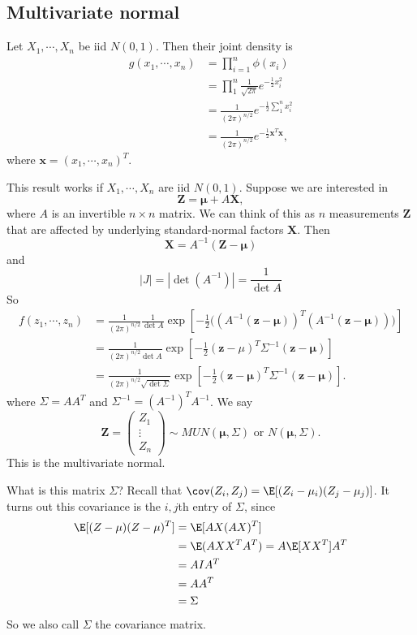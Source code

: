 \documentclass[a4paper]{article}
\begin{document}
\subsection{Multivariate normal}
Let $X_1, \cdots, X_n$ be iid $N(0, 1)$. Then their joint density is
\begin{align*}
  g(x_1, \cdots, x_n) &= \prod_{i = 1}^n \phi(x_i) \\
  &= \prod_{1}^n\frac{1}{\sqrt{2\pi}}e^{-\frac{1}{2}x_i^2}\\
  &= \frac{1}{(2\pi)^{n/2}} e^{-\frac{1}{2}\sum_1^n x_i^2}\\
  &= \frac{1}{(2\pi)^{n/2}}e^{-\frac{1}{2}\mathbf{x}^T \mathbf{x}},
\end{align*}
where $\mathbf{x} = (x_1, \cdots, x_n)^T$.

This result works if $X_1, \cdots, X_n$ are iid $N(0, 1)$. Suppose we are interested in
\[
  \mathbf{Z} = \boldsymbol\mu + A\mathbf{X},
\]
where $A$ is an invertible $n\times n$ matrix. We can think of this as $n$ measurements $\mathbf{Z}$ that are affected by underlying standard-normal factors $\mathbf{X}$. Then
\[
  \mathbf{X} = A^{-1}(\mathbf{Z} - \boldsymbol\mu)
\]
and
\[
  |J| = |\det (A^{-1})| = \frac{1}{\det A}
\]
So
\begin{align*}
  f(z_1, \cdots, z_n) &= \frac{1}{(2\pi)^{n/2}}\frac{1}{\det A}\exp\left[-\frac{1}{2}\big((A^{-1}(\mathbf{z} - \boldsymbol\mu))^T(A^{-1}(\mathbf{z} - \boldsymbol\mu))\big)\right]\\
  &= \frac{1}{(2\pi)^{n/2}\det A}\exp\left[-\frac{1}{2}(\mathbf{z} - \mu)^T \Sigma^{-1}(\mathbf{z} - \boldsymbol\mu)\right]\\
  &= \frac{1}{(2\pi)^{n/2}\sqrt{\det \Sigma}}\exp\left[-\frac{1}{2}(\mathbf{z} - \boldsymbol\mu)^T \Sigma^{-1}(\mathbf{z} - \boldsymbol\mu)\right].
\end{align*}
where $\Sigma = AA^T$ and $\Sigma^{-1} = (A^{-1})^TA^{-1}$. We say
\[
  \mathbf{Z} =
  \begin{pmatrix}
    Z_1\\
    \vdots\\
    Z_n
  \end{pmatrix}
  \sim MUN(\boldsymbol\mu, \Sigma)\text{ or }N(\boldsymbol\mu, \Sigma).
\]
This is the multivariate normal.

What is this matrix $\Sigma$? Recall that $\cov(Z_i, Z_j) = \E[(Z_i - \mu_i)(Z_j - \mu_j)]$. It turns out this covariance is the $i, j$th entry of $\Sigma$, since
\begin{align*}
  \E[(Z - \mu)(Z - \mu)^T] &= \E[AX(AX)^T]\\
  &= \E(AXX^TA^T) = A\E[XX^T]A^T\\
  &= AIA^T\\
  &= AA^T \\
  &= \Sigma
\end{align*}
So we also call $\Sigma$ the covariance matrix.
\end{document}
